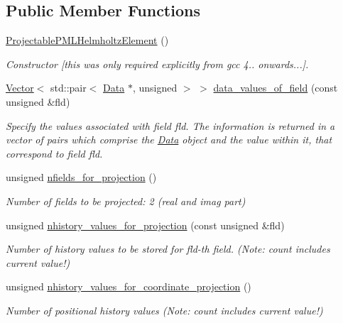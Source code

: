 \subsection*{Public Member Functions}
\begin{DoxyCompactItemize}
\item 
\hyperlink{classoomph_1_1ProjectablePMLHelmholtzElement_a005f750d15074893d3ac428b49f2318d}{Projectable\+P\+M\+L\+Helmholtz\+Element} ()
\begin{DoxyCompactList}\small\item\em Constructor \mbox{[}this was only required explicitly from gcc 4.. onwards...\mbox{]}. \end{DoxyCompactList}\item 
\hyperlink{classoomph_1_1Vector}{Vector}$<$ std\+::pair$<$ \hyperlink{classoomph_1_1Data}{Data} $\ast$, unsigned $>$ $>$ \hyperlink{classoomph_1_1ProjectablePMLHelmholtzElement_a7bae5d4f8a8716c9db2119094f9f08bc}{data\+\_\+values\+\_\+of\+\_\+field} (const unsigned \&fld)
\begin{DoxyCompactList}\small\item\em Specify the values associated with field fld. The information is returned in a vector of pairs which comprise the \hyperlink{classoomph_1_1Data}{Data} object and the value within it, that correspond to field fld. \end{DoxyCompactList}\item 
unsigned \hyperlink{classoomph_1_1ProjectablePMLHelmholtzElement_ab90d84e474fccf3a814ea99ecd02e61c}{nfields\+\_\+for\+\_\+projection} ()
\begin{DoxyCompactList}\small\item\em Number of fields to be projected\+: 2 (real and imag part) \end{DoxyCompactList}\item 
unsigned \hyperlink{classoomph_1_1ProjectablePMLHelmholtzElement_a5b0bad4b386bf0d31aeccb963e0814a0}{nhistory\+\_\+values\+\_\+for\+\_\+projection} (const unsigned \&fld)
\begin{DoxyCompactList}\small\item\em Number of history values to be stored for fld-\/th field. (Note\+: count includes current value!) \end{DoxyCompactList}\item 
unsigned \hyperlink{classoomph_1_1ProjectablePMLHelmholtzElement_a3af221fe8b94d8a50917c92c3cc94b5d}{nhistory\+\_\+values\+\_\+for\+\_\+coordinate\+\_\+projection} ()
\begin{DoxyCompactList}\small\item\em Number of positional history values (Note\+: count includes current value!) \end{DoxyCompactList}\item 

\end{DoxyCompactItemize}
